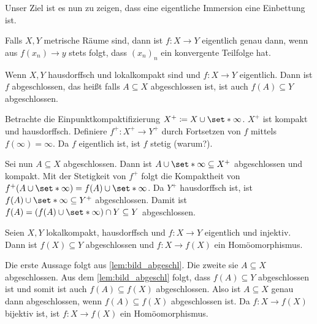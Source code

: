 Unser Ziel ist  es nun zu zeigen, dass eine eigentliche Immersion eine Einbettung ist.

Falls $X,Y$ metrische Räume sind, dann ist $f \colon X \to Y$ eigentlich genau dann, wenn aus $f(x_n) \to y$ stets folgt, dass $(x_n)_n$ ein konvergente Teilfolge hat.

\begin{lemma}[label=lem:bild_abgeschl]
	Wenn $X,Y$ hausdorffsch und lokalkompakt sind und $f \colon X \to Y$ eigentlich.
	Dann ist $f$ abgeschlossen, das heißt falls $A \subseteq X$ abgeschlossen ist, ist auch $f(A) \subseteq Y$ abgeschlossen.
\end{lemma}
\begin{beweis}
	Betrachte die Einpunktkompaktifizierung $X^+ \coloneqq X \cup \set*{\infty}$.
	$X^+$ ist kompakt und hausdorffsch.
	Definiere $f^+ \colon X^+ \to Y^+$ durch Fortsetzen von $f$ mittels $f(\infty)=\infty$.
	Da $f$ eigentlich ist, ist $f$ stetig (warum?).
	
	Sei nun $A \subseteq X$ abgeschlossen.
	Dann ist $A \cup \set*{\infty} \subseteq X^+$ abgeschlossen und kompakt.
	Mit der Stetigkeit von $f^+$ folgt die Kompaktheit von $f^+(A \cup \set*{\infty}) = f(A) \cup \set*{\infty}$.
	Da $Y^+$ hausdorffsch ist, ist $f(A) \cup \set*{\infty} \subseteq Y^+$ abgeschlossen.
	Damit ist $f(A) = (f(A) \cup \set*{\infty}) \cap Y \subseteq Y$ abgeschlossen.
\end{beweis}

\begin{korollar}[label=kor:homeo_bild]
	Seien $X,Y$ lokalkompakt, hausdorffsch und $f \colon X \to Y$ eigentlich und injektiv.
	Dann ist $f(X) \subseteq Y$ abgeschlossen und $f \colon X \to f(X)$ ein Homöomorphismus.
\end{korollar}
\begin{beweis}
	Die erste Aussage folgt aus \cref{lem:bild_abgeschl}.
	Die zweite sie $A \subseteq X$ abgeschlossen.
	Aus dem \cref{lem:bild_abgeschl} folgt, dass $f(A) \subseteq Y$ abgeschlossen ist und somit ist auch $f(A) \subseteq f(X)$ abgeschlossen.
	Also ist $A \subseteq X$ genau dann abgeschlossen, wenn $f(A) \subseteq f(X)$ abgeschlossen ist.
	Da $f \colon X \to f(X)$ bijektiv ist, ist $f \colon X \to f(X)$ ein Homöomorphismus. 
\end{beweis}

